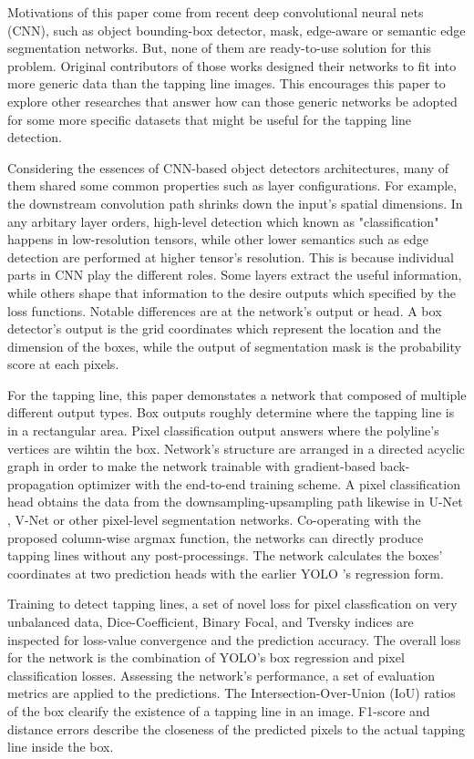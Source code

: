 \documentclass[default,pdflatex,iicol]{sn-jnl}%
\begin{document}
Motivations of this paper come from recent deep convolutional neural nets (CNN), such as object bounding-box detector, mask, edge-aware or semantic edge segmentation networks. But, none of them are ready-to-use solution for this problem. Original contributors of those works designed their networks to fit into more generic data than the tapping line images. This encourages this paper to explore other researches that answer how can those generic networks be adopted for some more specific datasets that might be useful for the tapping line detection.

Considering the essences of CNN-based object detectors architectures, many of them shared some common properties such as layer configurations. For example, the downstream convolution path shrinks down the input's spatial dimensions. In any arbitary layer orders, high-level detection which known as "classification" happens in low-resolution tensors, while other lower semantics such as edge detection are performed at higher tensor's resolution. This is because individual parts in CNN play the different roles. Some layers extract the useful information, while others shape that information to the desire outputs which specified by the loss functions. Notable differences are at the network's output or head. A box detector's output is the grid coordinates which represent the location and the dimension of the boxes, while the output of segmentation mask is the probability score at each pixels.

For the tapping line, this paper demonstates a network that composed of multiple different output types. Box outputs roughly determine where the tapping line is in a rectangular area. Pixel classification output answers where the polyline's vertices are wihtin the box. Network's structure are arranged in a directed acyclic graph in order to make the network trainable with gradient-based back-propagation optimizer with the end-to-end training scheme. A pixel classification head obtains the data from the downsampling-upsampling path likewise in U-Net \cite{unet}, V-Net \cite{vnet} or other pixel-level segmentation networks. Co-operating with the proposed column-wise argmax function, the networks can directly produce tapping lines without any post-processings. The network calculates the boxes' coordinates at two prediction heads with the earlier YOLO \cite{redmonyolov2} 's regression form.

Training to detect tapping lines, a set of novel loss for pixel classfication on very unbalanced data, Dice-Coefficient, Binary Focal, and Tversky indices are inspected for loss-value convergence and the prediction accuracy. The overall loss for the network is the combination of YOLO's box regression and pixel classification losses. Assessing the network's performance, a set of evaluation metrics are applied to the predictions. The Intersection-Over-Union (IoU) ratios of the box clearify the existence of a tapping line in an image. F1-score and distance errors describe the closeness of the predicted pixels to the actual tapping line inside the box.
\end{document}
